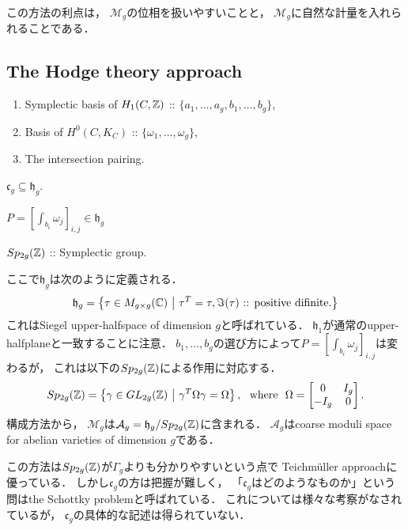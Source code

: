 \documentclass[a4paper]{jsarticle}
\newcommand{\modA}{\mathcal{A}}
\newcommand{\modM}{\mathcal{M}}
\newcommand{\inlinematrix}[1]{\begin{bmatrix} #1 \end{bmatrix}}
\begin{document}
    この方法の利点は，
    $\modM_g$の位相を扱いやすいことと，
    $\modM_g$に自然な計量を入れられることである．

    \subsection{The Hodge theory approach}
    \begin{description}[leftmargin=!,labelwidth=\widthof{\bfseries Container Space}]
        \item[Extra Data]
            \begin{enumerate}[leftmargin=*]
                \item Symplectic basis of $H_1(C, \mathbb{Z})$ :: $\{a_1,\dots,a_g, b_1,\dots,b_g\}$,
                \item Basis of $H^0(C, K_C)$ :: $\{\omega_1,\dots,\omega_g\}$,
                \item The intersection pairing.
            \end{enumerate}
        \item[Container Space] $\mathfrak{c}_g \subseteq \mathfrak{h}_g$.
        \item[Correspondance] $P=[\int_{b_i} \omega_j ]_{i,j} \in \mathfrak{h}_g$
        \item[Group] $Sp_{2g}(\mathbb{Z})$ :: Symplectic group.
    \end{description}
    ここで$\mathfrak{h}_g$は次のように定義される．
    \[
        \mathfrak{h}_g=
        \left\{
            \tau \in M_{g \times g}(\mathbb{C})
            ~\middle|~
            \tau^T=\tau, \Im(\tau)\text{ :: positive difinite.}
        \right\}
    \]
    これはSiegel upper-halfspace of dimension $g$と呼ばれている．
    $\mathfrak{h}_1$が通常のupper-halfplaneと一致することに注意．
    $b_1,\dots,b_g$の選び方によって$P=[\int_{b_i} \omega_j ]_{i,j}$は変わるが，
    これは以下の$Sp_{2g}(\mathbb{Z})$による作用に対応する．
    \[
        Sp_{2g}(\Z)=
        \left\{
            \gamma \in GL_{2g}(\Z)
            ~\middle|~
            \gamma^T \Omega \gamma=\Omega
        \right\},
        \mwhere
        \Omega=\inlinematrix{ 0 & I_g \\ -I_g & 0 }.
    \]
    構成方法から，
    $\modM_g$は$\modA_g=\mathfrak{h}_g/Sp_{2g}(\Z)$に含まれる．
    $\modA_g$はcoarse moduli space for abelian varieties of dimension $g$である．

    この方法は$Sp_{2g}(\mathbb{Z})$が$\Gamma_g$よりも分かりやすいという点で
    Teichm\"uller approachに優っている．
    しかし$\mathfrak{c}_g$の方は把握が難しく，
    「$\mathfrak{c}_g$はどのようなものか」という問はthe Schottky problemと呼ばれている．
    これについては様々な考察がなされているが，
    $\mathfrak{c}_g$の具体的な記述は得られていない．
\end{document}
